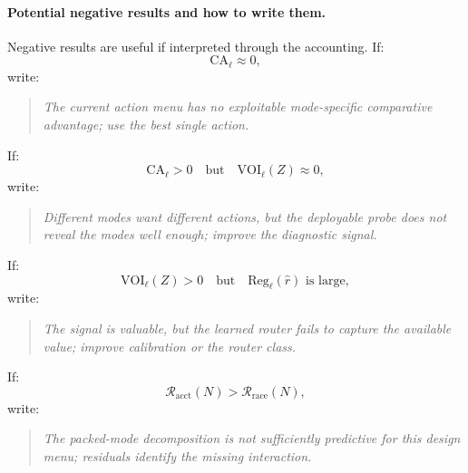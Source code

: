 \documentclass{article}
\begin{document}
\paragraph{Potential negative results and how to write them.}
Negative results are useful if interpreted through the accounting.
If:
\[
    \mathrm{CA}_\ell\approx 0,
\]
write:
\begin{quote}\itshape
The current action menu has no exploitable mode-specific comparative advantage;
use the best single action.
\end{quote}
If:
\[
    \mathrm{CA}_\ell>0
    \quad\text{but}\quad
    \mathrm{VOI}_\ell(Z)\approx 0,
\]
write:
\begin{quote}\itshape
Different modes want different actions, but the deployable probe does not reveal
the modes well enough; improve the diagnostic signal.
\end{quote}
If:
\[
    \mathrm{VOI}_\ell(Z)>0
    \quad\text{but}\quad
    \mathrm{Reg}_\ell(\hat r)\text{ is large},
\]
write:
\begin{quote}\itshape
The signal is valuable, but the learned router fails to capture the available value;
improve calibration or the router class.
\end{quote}
If:
\[
    \mathcal R_{\mathrm{acct}}(N)>\mathcal R_{\mathrm{race}}(N),
\]
write:
\begin{quote}\itshape
The packed-mode decomposition is not sufficiently predictive for this design menu;
residuals identify the missing interaction.
\end{quote}
\end{document}
